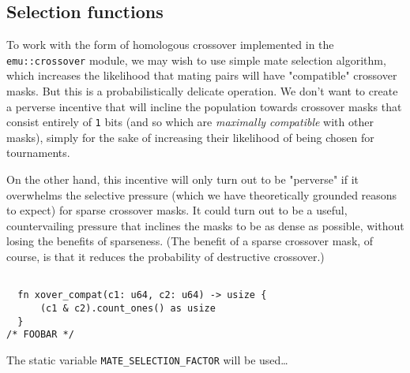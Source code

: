 \documentclass[11pt]{article}
\begin{document}
\subsection{Selection functions}
\label{sec:orge3ba170}

To work with the form of homologous crossover implemented in the
\texttt{emu::crossover} module, we may wish to use simple mate selection
algorithm, which increases the likelihood that mating pairs will
have "compatible" crossover masks. But this is a probabilistically
delicate operation. We don't want to create a perverse incentive
that will incline the population towards crossover masks that consist
entirely of \texttt{1} bits (and so which are \emph{maximally compatible} with other
masks), simply for the sake of increasing their likelihood of being
chosen for tournaments. 

On the other hand, this incentive will only turn out to be "perverse"
if it overwhelms the selective pressure (which we have theoretically
grounded reasons to expect) for sparse crossover masks. It could turn
out to be a useful, countervailing pressure that inclines the masks
to be as dense as possible, without losing the benefits of sparseness.
(The benefit of a sparse crossover mask, of course, is that it reduces
the probability of destructive crossover.)

\lstset{language=rust,label=org3c691b0,caption= ,captionpos=b,numbers=none}
\begin{lstlisting}

  fn xover_compat(c1: u64, c2: u64) -> usize {
      (c1 & c2).count_ones() as usize
  }
/* FOOBAR */
\end{lstlisting}

The static variable \texttt{MATE\_SELECTION\_FACTOR} will be used\ldots{}
\end{document}

